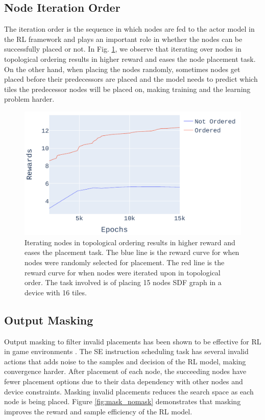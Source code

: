 \subsection{Node Iteration Order}

The iteration order is the sequence in which nodes are fed to the actor model in the RL framework and plays an important role in whether the nodes can be successfully placed or not. 
In Fig. \ref{fig:ordered_placement}, we observe that iterating over nodes in topological 
ordering results in higher reward and eases the node placement task. 
On the other hand, when placing the nodes randomly, sometimes nodes get placed before their predecessors are placed and the model needs to predict which tiles the predecessor nodes will be placed on, making training and the learning problem harder.

\begin{figure}[h]
  \centering
  \includegraphics[width=\linewidth]{fig/plot_ordered.pdf}
  \caption{Iterating nodes in topological ordering results in higher reward and eases the placement task. 
 The blue line is the reward curve for when nodes were randomly selected for placement. The red line is the reward curve for when nodes were iterated upon in topological order. The task involved is of placing 15 nodes SDF graph in a device with 16 tiles.}
  \label{fig:ordered_placement}
\end{figure}


\subsection{Output Masking}
\label{subsec:output_masking}
Output masking to filter invalid placements has been shown to be effective for RL in game environments \cite{Shengyi_mask}. 
The SE instruction scheduling task has several invalid actions that adds noise to the samples and decision of the RL model, making convergence harder. 
After placement of each node, the succeeding nodes have fewer placement options due to their data dependency with other nodes and device constraints.
Masking invalid placements reduces the search space as each node is being placed. 
Figure \ref{fig:mask_nomask} demonstrates that masking improves the reward and sample efficiency of the RL model.

